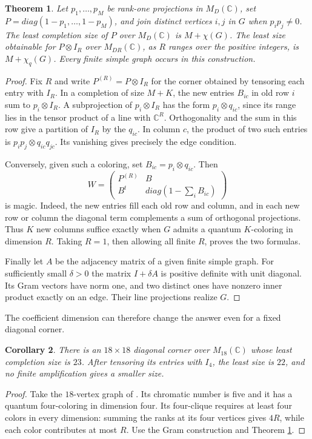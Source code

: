 \documentclass[11pt,a4paper]{article}
\newtheorem{thm}{Theorem}[section]
\newtheorem{cor}[thm]{Corollary}
\begin{document}
\begin{thm}\label{colorcompletion}
Let $p_1,\ldots,p_M$ be rank-one projections in $M_D(\mathbb C)$, set $P=diag(1-p_1,\ldots,1-p_M)$, and join distinct vertices $i,j$ in $G$ when $p_ip_j\ne0$. The least completion size of $P$ over $M_D(\mathbb C)$ is $M+\chi(G)$. The least size obtainable for $P\otimes I_R$ over $M_{DR}(\mathbb C)$, as $R$ ranges over the positive integers, is $M+\chi_q(G)$. Every finite simple graph occurs in this construction.
\end{thm}
\begin{proof}
Fix $R$ and write $P^{(R)}=P\otimes I_R$ for the corner obtained by tensoring each entry with $I_R$. In a completion of size $M+K$, the new entries $B_{ic}$ in old row $i$ sum to $p_i\otimes I_R$. A subprojection of $p_i\otimes I_R$ has the form $p_i\otimes q_{ic}$, since its range lies in the tensor product of a line with $\mathbb C^R$. Orthogonality and the sum in this row give a partition of $I_R$ by the $q_{ic}$. In column $c$, the product of two such entries is $p_ip_j\otimes q_{ic}q_{jc}$. Its vanishing gives precisely the edge condition.

Conversely, given such a coloring, set $B_{ic}=p_i\otimes q_{ic}$. Then
\[
 W=\begin{pmatrix}
 P^{(R)}&B\\ B^t&diag(1-\sum_i B_{ic})
 \end{pmatrix}
\]
is magic. Indeed, the new entries fill each old row and column, and in each new row or column the diagonal term complements a sum of orthogonal projections. Thus $K$ new columns suffice exactly when $G$ admits a quantum $K$-coloring in dimension $R$. Taking $R=1$, then allowing all finite $R$, proves the two formulas.

Finally let $A$ be the adjacency matrix of a given finite simple graph. For sufficiently small $\delta>0$ the matrix $I+\delta A$ is positive definite with unit diagonal. Its Gram vectors have norm one, and two distinct ones have nonzero inner product exactly on an edge. Their line projections realize $G$.
\end{proof}

The coefficient dimension can therefore change the answer even for a fixed diagonal corner.

\begin{cor}
There is an $18\times18$ diagonal corner over $M_{18}(\mathbb C)$ whose least completion size is $23$. After tensoring its entries with $I_4$, the least size is $22$, and no finite amplification gives a smaller size.
\end{cor}
\begin{proof}
Take the $18$-vertex graph of \cite{coloring}. Its chromatic number is five and it has a quantum four-coloring in dimension four. Its four-clique requires at least four colors in every dimension: summing the ranks at its four vertices gives $4R$, while each color contributes at most $R$. Use the Gram construction and Theorem \ref{colorcompletion}.
\end{proof}
\end{document}
